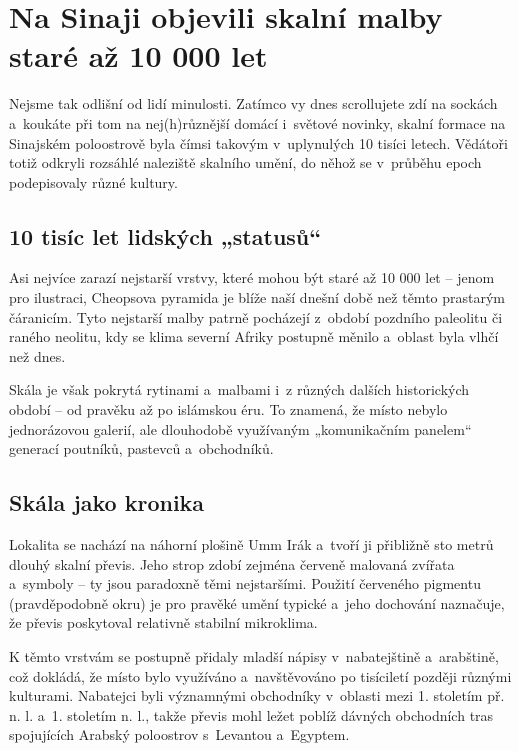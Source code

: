 \documentclass[main.tex]{subfiles}
\begin{document}
\section{Na Sinaji objevili skalní malby staré až 10 000 let}
Nejsme tak odlišní od lidí minulosti. Zatímco vy dnes scrollujete zdí na sockách a~koukáte při tom na nej(h)různější domácí i~světové novinky, skalní formace na Sinajském poloostrově byla čímsi takovým v~uplynulých 10 tisíci letech. Vědátoři totiž odkryli rozsáhlé naleziště skalního umění, do něhož se v~průběhu epoch podepisovaly různé kultury.
\subsection*{10 tisíc let lidských „statusů“}
Asi nejvíce zarazí nejstarší vrstvy, které mohou být staré až 10 000 let – jenom pro ilustraci, Cheopsova pyramida je blíže naší dnešní době než těmto prastarým čáranicím. Tyto nejstarší malby patrně pocházejí z~období pozdního paleolitu či raného neolitu, kdy se klima severní Afriky postupně měnilo a~oblast byla vlhčí než dnes.\par
Skála je však pokrytá rytinami a~malbami i~z různých dalších historických období – od pravěku až po islámskou éru. To znamená, že místo nebylo jednorázovou galerií, ale dlouhodobě využívaným „komunikačním panelem“ generací poutníků, pastevců a~obchodníků.
\subsection*{Skála jako kronika}
Lokalita se nachází na náhorní plošině Umm Irák a~tvoří ji přibližně sto metrů dlouhý skalní převis. Jeho strop zdobí zejména červeně malovaná zvířata a~symboly – ty jsou paradoxně těmi nejstaršími. Použití červeného pigmentu (pravděpodobně okru) je pro pravěké umění typické a~jeho dochování naznačuje, že převis poskytoval relativně stabilní mikroklima.\par
K těmto vrstvám se postupně přidaly mladší nápisy v~nabatejštině a~arabštině, což dokládá, že místo bylo využíváno a~navštěvováno po tisíciletí později různými kulturami. Nabatejci byli významnými obchodníky v~oblasti mezi 1. stoletím př. n. l. a~1. stoletím n. l., takže převis mohl ležet poblíž dávných obchodních tras spojujících Arabský poloostrov s~Levantou a~Egyptem.
\end{document}
